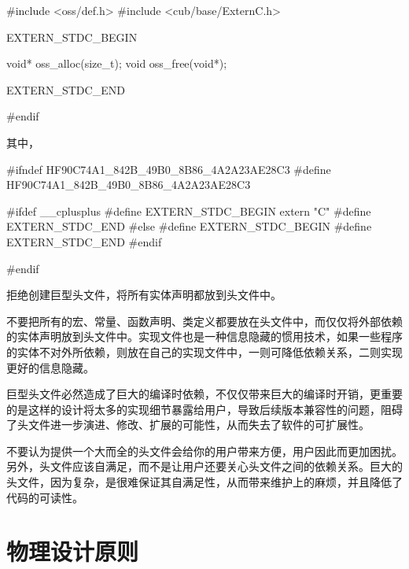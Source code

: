 \begin{content}
\begin{leftbar}
\begin{c++}[caption={\ttfamily{oss/oss\_memery.h}}]
#include <oss/def.h>
#include <cub/base/ExternC.h>

EXTERN_STDC_BEGIN

void* oss_alloc(size_t);
void  oss_free(void*);

EXTERN_STDC_END

#endif
\end{c++}
\end{leftbar}

其中，

\begin{leftbar}
\begin{c++}[caption={\ttfamily{cub/base/ExternC.h}}]
#ifndef HF90C74A1_842B_49B0_8B86_4A2A23AE28C3
#define HF90C74A1_842B_49B0_8B86_4A2A23AE28C3

#ifdef __cplusplus
    #define EXTERN_STDC_BEGIN extern "C" {
    #define EXTERN_STDC_END  }
#else
    #define EXTERN_STDC_BEGIN
    #define EXTERN_STDC_END
#endif

#endif
\end{c++}
\end{leftbar}

\begin{advise}
拒绝创建巨型头文件，将所有实体声明都放到头文件中。
\end{advise}

不要把所有的宏、常量、函数声明、类定义都要放在头文件中，而仅仅将外部依赖的实体声明放到头文件中。实现文件也是一种信息隐藏的惯用技术，如果一些程序的实体不对外所依赖，则放在自己的实现文件中，一则可降低依赖关系，二则实现更好的信息隐藏。

巨型头文件必然造成了巨大的编译时依赖，不仅仅带来巨大的编译时开销，更重要的是这样的设计将太多的实现细节暴露给用户，导致后续版本兼容性的问题，阻碍了头文件进一步演进、修改、扩展的可能性，从而失去了软件的可扩展性。

不要认为提供一个大而全的头文件会给你的用户带来方便，用户因此而更加困扰。另外，头文件应该自满足，而不是让用户还要关心头文件之间的依赖关系。巨大的头文件，因为复杂，是很难保证其自满足性，从而带来维护上的麻烦，并且降低了代码的可读性。

\end{content}

\section{物理设计原则}

